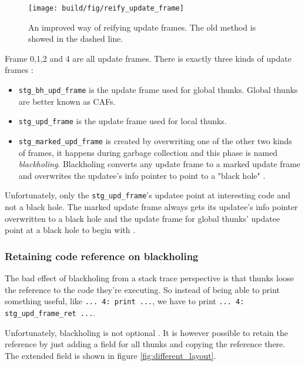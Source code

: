 \begin{figure}
\begin{mdframed}
  \texttt{[image: build/fig/reify\_update\_frame]}
  \caption{An improved way of reifying update frames. The old method is
  showed in the dashed line.}
  \label{fig:reify_update_frame}
\end{mdframed}
\end{figure}

Frame 0,1,2 and 4 are all update frames. There is exactly three kinds
of update frames \cite{github_updates_cmm}:

\begin{itemize}
  \item
    \texttt{stg\_bh\_upd\_frame} is the update frame used for global
      thunks. Global thunks are better known as CAFs.
  \item
    \texttt{stg\_upd\_frame} is the update frame used for local
  thunks.
  \item
     \texttt{stg\_marked\_upd\_frame} is created
  by overwriting one of the other two kinds of frames, it
  happens during garbage collection and this phase is named
  \emph{blackholing}. Blackholing converts any update frame to a
  marked update frame \cite{github_overwrite_update_frame} and
  overwrites the updatee's info pointer to point to a "black hole"
  \cite{github_overwrite_blackhole}.
\end{itemize}

Unfortunately, only the \texttt{stg\_upd\_frame}'s updatee point
at interesting code and not a black hole. The marked update frame
always gets its updatee's info pointer overwritten to a black
hole \cite{github_overwrite_blackhole} and the update frame
for global thunks' updatee point at a black hole to begin with
\cite{github_set_hdr_caf_blackhole}.

\subsubsection{Retaining code reference on blackholing}

The bad effect of blackholing from a stack trace perspective is
that thunks loose the reference to the code they're executing. So instead
of being able to print something useful, like  \texttt{... 4: print ...},
we have to print \texttt{... 4: stg\_upd\_frame\_ret ...}.

Unfortunately, blackholing is not optional
\cite{github_blackholing_not_optional}. It is however possible to
retain the reference by just adding a field for all thunks and
copying the reference there. The extended field is shown in figure
\ref{fig:different_layout}.

